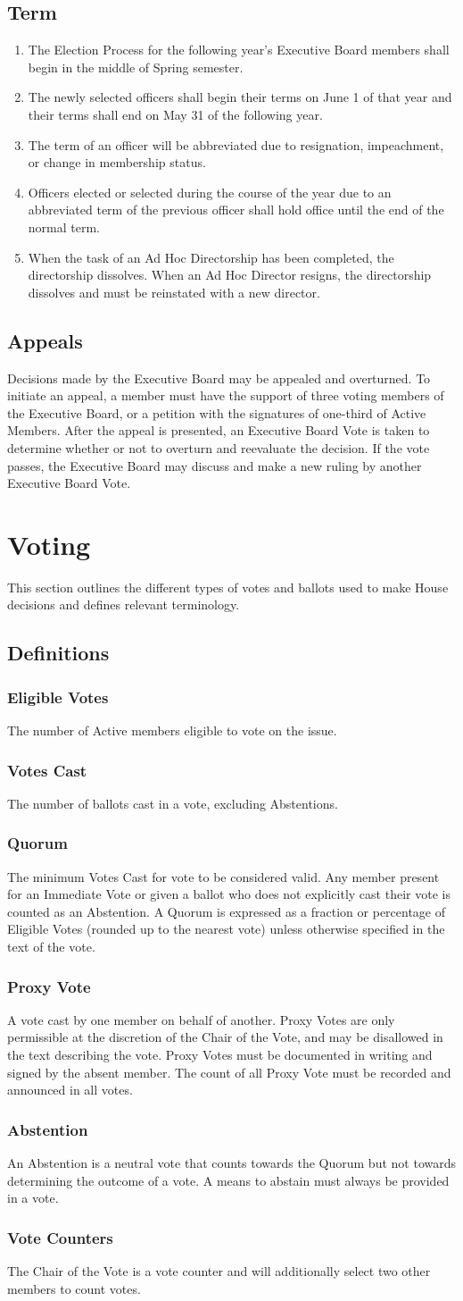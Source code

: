 \documentclass{article}
\newcommand{\article}[1]{\section{#1} \label{#1}}
\newcommand{\asection}[1]{\subsection{#1} \label{#1}}
\newcommand{\asubsection}[1]{\subsubsection{#1} \label{#1}}
\begin{document}
\asection{Term}
\begin{enumerate}
\item The Election Process for the following year's Executive Board members shall begin in the middle of Spring semester.
\item The newly selected officers shall begin their terms on June 1 of that year and their terms shall end on May 31 of the following year.
\item The term of an officer will be abbreviated due to resignation, impeachment, or change in membership status.
\item Officers elected or selected during the course of the year due to an abbreviated term of the previous officer shall hold office until the end of the normal term.
\item When the task of an Ad Hoc Directorship has been completed, the directorship dissolves.
	When an Ad Hoc Director resigns, the directorship dissolves and must be reinstated with a new director.
\end{enumerate}

\asection{Appeals}
Decisions made by the Executive Board may be appealed and overturned.
To initiate an appeal, a member must have the support of three voting members of the Executive Board, or a petition with the signatures of one-third of Active Members.
After the appeal is presented, an Executive Board Vote is taken to determine whether or not to overturn and reevaluate the decision.
If the vote passes, the Executive Board may discuss and make a new ruling by another Executive Board Vote.

\article{Voting}
This section outlines the different types of votes and ballots used to make House decisions and defines relevant terminology.
\asection{Definitions}
\asubsection{Eligible Votes}
The number of Active members eligible to vote on the issue.
\asubsection{Votes Cast}
The number of ballots cast in a vote, excluding Abstentions.
\asubsection{Quorum}
The minimum Votes Cast for vote to be considered valid.
Any member present for an Immediate Vote or given a ballot who does not explicitly cast their vote is counted as an Abstention.
A Quorum is expressed as a fraction or percentage of Eligible Votes (rounded up to the nearest vote) unless otherwise specified in the text of the vote.
\asubsection{Proxy Vote}
A vote cast by one member on behalf of another.
Proxy Votes are only permissible at the discretion of the Chair of the Vote, and may be disallowed in the text describing the vote.
Proxy Votes must be documented in writing and signed by the absent member.
The count of all Proxy Vote must be recorded and announced in all votes.
\asubsection{Abstention}
An Abstention is a neutral vote that counts towards the Quorum but not towards determining the outcome of a vote.
A means to abstain must always be provided in a vote.
\asubsection{Vote Counters}
The Chair of the Vote is a vote counter and will additionally select two other members to count votes.
\end{document}
